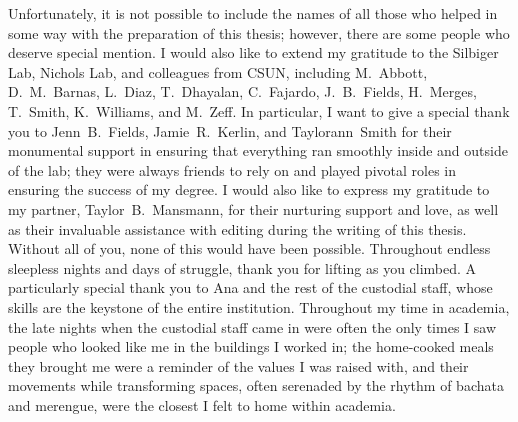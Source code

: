 \documentclass{CSUNthesis}
\begin{document}
\begin{spacing}{1.5}
  \par Unfortunately, it is not possible to include the names of all those who helped in some way with the preparation of this thesis; however, there are some people who deserve special mention. I would also like to extend my gratitude to the Silbiger Lab, Nichols Lab, and colleagues from CSUN, including M.~Abbott, D.~M.~Barnas, L.~Diaz, T.~Dhayalan, C.~Fajardo, J.~B.~Fields, H.~Merges, T.~Smith, K.~Williams, and M.~Zeff. In particular, I want to give a special thank you to Jenn~B.~Fields, Jamie~R.~Kerlin, and Taylorann~Smith for their monumental support in ensuring that everything ran smoothly inside and outside of the lab; they were always friends to rely on and played pivotal roles in ensuring the success of my degree. I would also like to express my gratitude to my partner, Taylor~B.~Mansmann, for their nurturing support and love, as well as their invaluable assistance with editing during the writing of this thesis. Without all of you, none of this would have been possible. Throughout endless sleepless nights and days of struggle, thank you for lifting as you climbed. A particularly special thank you to Ana and the rest of the custodial staff, whose skills are the keystone of the entire institution. Throughout my time in academia, the late nights when the custodial staff came in were often the only times I saw people who looked like me in the buildings I worked in; the home-cooked meals they brought me were a reminder of the values I was raised with, and their movements while transforming spaces, often serenaded by the rhythm of bachata and merengue, were the closest I felt to home within academia. 

\end{spacing}
\end{document}
